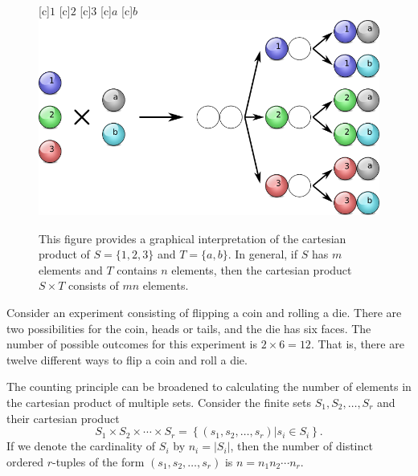 \begin{figure}[htb!]
\begin{center}
\begin{psfrags}
[c]{$1$}
[c]{$2$}
[c]{$3$}
[c]{$a$}
[c]{$b$}
\includegraphics[height=6.495cm]{Figures/4Chapter/countingprinciple}
\end{psfrags}
\caption{This figure provides a graphical interpretation of the cartesian product of $S = \{ 1, 2, 3 \}$ and $T = \{ a, b \}$.
In general, if $S$ has $m$ elements and $T$ contains $n$ elements, then the cartesian product $S \times T$ consists of $m n$ elements.}
\label{figure:CountingPrinciple}
\end{center}
\end{figure}

\begin{example}
Consider an experiment consisting of flipping a coin and rolling a die.
There are two possibilities for the coin, heads or tails, and the die has six faces.
The number of possible outcomes for this experiment is $2 \times 6 = 12$.
That is, there are twelve different ways to flip a coin and roll a die.
\end{example}

The counting principle can be broadened to calculating the number of elements in the cartesian product of multiple sets.
Consider the finite sets $S_1, S_2, \ldots, S_r$ and their cartesian product
\begin{equation*}
S_1 \times S_2 \times \cdots \times S_r
= \left\{ (s_1, s_2, \ldots, s_r) | s_i \in S_i \right\} .
\end{equation*}
If we denote the cardinality of $S_i$ by $n_i = | S_i |$, then the number of distinct ordered $r$-tuples of the form $(s_1, s_2, \ldots, s_r)$ is $n = n_1 n_2 \cdots n_r$.

